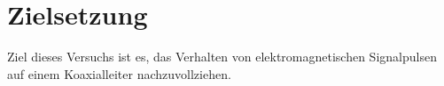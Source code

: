 \section{Zielsetzung}
Ziel dieses Versuchs ist es, das Verhalten von elektromagnetischen Signalpulsen auf einem Koaxialleiter nachzuvollziehen.